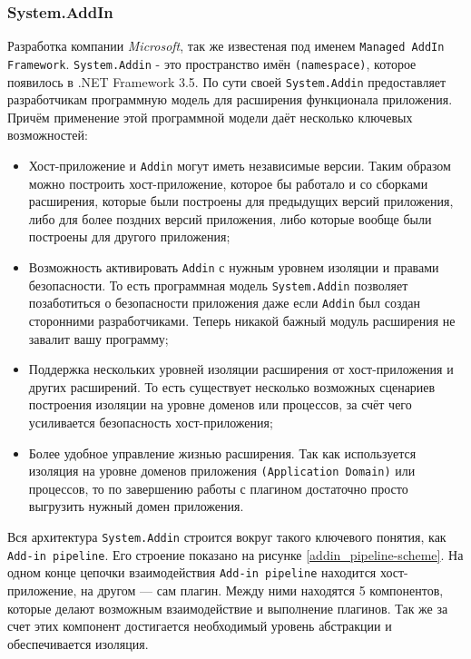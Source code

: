 \subsubsection{System.AddIn}

Разработка компании {\it Microsoft}, так же известеная под именем {\tt Managed AddIn Framework}. {\tt System.Addin} - это пространство имён {\tt(namespace)}, которое появилось в .NET Framework 3.5. По сути своей {\tt System.Addin} предоставляет разработчикам программную модель для расширения функционала приложения. Причём применение этой программной модели даёт несколько ключевых возможностей:

\begin{itemize}

  \item Хост-приложение и {\tt Addin} могут иметь независимые версии. Таким образом можно построить хост-приложение, которое бы работало и со сборками расширения, которые были построены для предыдущих версий приложения, либо для более поздних версий приложения, либо которые вообще были построены для другого приложения;

  \item Возможность активировать {\tt Addin} с нужным уровнем изоляции и правами безопасности. То есть программная модель {\tt System.Addin} позволяет позаботиться о безопасности приложения даже если {\tt Addin} был создан сторонними разработчиками. Теперь никакой бажный модуль расширения не завалит вашу программу;

  \item Поддержка нескольких уровней изоляции расширения от хост-приложения и других расширений. То есть существует несколько возможных сценариев построения изоляции на уровне доменов или процессов, за счёт чего усиливается безопасность хост-приложения;

  \item Более удобное управление жизнью расширения. Так как используется изоляция на уровне доменов приложения {\tt (Application Domain)} или процессов, то по завершению работы с плагином достаточно просто выгрузить нужный домен приложения.

\end{itemize}

Вся архитектура {\tt System.Addin} строится вокруг такого ключевого понятия, как {\tt Add-in pipeline}. Его строение показано на рисунке \ref{addin_pipeline-scheme}. На одном конце цепочки взаимодействия {\tt Add-in pipeline} находится хост-приложение, на другом --- сам плагин. Между ними находятся 5 компонентов, которые делают возможным взаимодействие и выполнение плагинов. Так же за счет этих компонент достигается необходимый уровень абстракции и обеспечивается изоляция.

